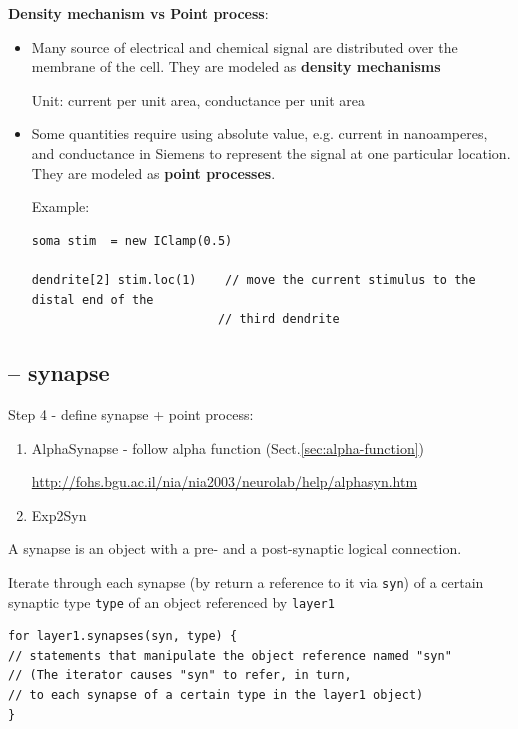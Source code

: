 {\bf Density mechanism vs Point process}:
\begin{itemize}
  \item Many source of electrical and chemical signal are distributed over the
  membrane of the cell. They are modeled as {\bf density mechanisms}
  
  Unit: current per unit area, conductance per unit area
  
  \item Some quantities require using absolute value, e.g. current in
  nanoamperes, and conductance in Siemens to represent the signal at one
  particular location. They are modeled as {\bf point processes}.
  
  Example:
\begin{verbatim}
soma stim  = new IClamp(0.5)

dendrite[2] stim.loc(1)    // move the current stimulus to the distal end of the
                          // third dendrite
\end{verbatim}
\end{itemize}

\subsection{-- synapse}

Step 4 - define synapse + point process: 
\begin{enumerate}
  \item AlphaSynapse - follow alpha function (Sect.\ref{sec:alpha-function})

\url{http://fohs.bgu.ac.il/nia/nia2003/neurolab/help/alphasyn.htm}

  \item Exp2Syn
\end{enumerate}

A synapse is an object with a pre- and a post-synaptic logical connection.

Iterate through each synapse (by return a reference to it via \verb!syn!) of a
certain synaptic type \verb!type! of an object referenced by \verb!layer1!
\begin{verbatim}
for layer1.synapses(syn, type) {
// statements that manipulate the object reference named "syn"
// (The iterator causes "syn" to refer, in turn,
// to each synapse of a certain type in the layer1 object)
}
\end{verbatim}


